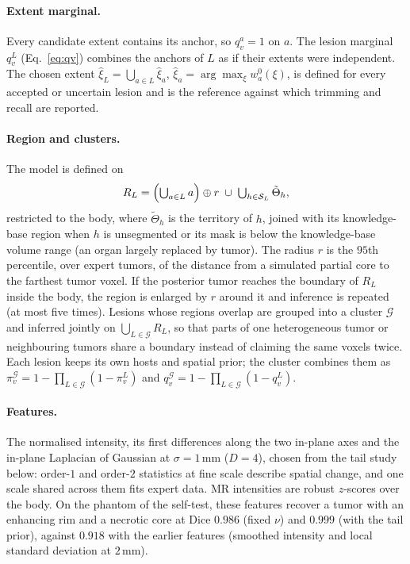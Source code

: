 \documentclass[fleqn,10pt]{olplainarticle}
\begin{document}
\paragraph{Extent marginal.} Every candidate extent contains its anchor, so $q^a_v=1$ on $a$. The lesion marginal $q^L_v$
(Eq.~\eqref{eq:qv}) combines the anchors of $L$ as if their extents were independent. The chosen extent
$\hat\xi_L=\bigcup_{a\in L}\hat\xi_a$, $\hat\xi_a=\arg\max_\xi w^0_a(\xi)$, is defined for every accepted or uncertain
lesion and is the reference against which trimming and recall are reported.

\paragraph{Region and clusters.} The model is defined on
\begin{equation}
\label{eq:roi}
R_L=\Bigl(\textstyle\bigcup_{a\in L}a\Bigr)\oplus r\;\cup\;\bigcup_{h\in\mathcal{S}_L}\tilde\Theta_h ,
\end{equation}
restricted to the body, where $\tilde\Theta_h$ is the territory of $h$, joined with its knowledge-base region when $h$ is
unsegmented or its mask is below the knowledge-base volume range (an organ largely replaced by tumor). The radius $r$ is the
$95$th percentile, over expert tumors, of the distance from a simulated partial core to the farthest tumor voxel. If the
posterior tumor reaches the boundary of $R_L$ inside the body, the region is enlarged by $r$ around it and inference is
repeated (at most five times). Lesions whose regions overlap are grouped into a cluster $\mathcal{G}$ and inferred jointly on
$\bigcup_{L\in\mathcal{G}}R_L$, so that parts of one heterogeneous tumor or neighbouring tumors share a boundary instead of
claiming the same voxels twice. Each lesion keeps its own hosts and spatial prior; the cluster combines them as
$\pi^{\mathcal{G}}_v=1-\prod_{L\in\mathcal{G}}(1-\pi^L_v)$ and $q^{\mathcal{G}}_v=1-\prod_{L\in\mathcal{G}}(1-q^L_v)$.

\paragraph{Features.} The normalised intensity, its first differences along the two in-plane axes and the in-plane
Laplacian of Gaussian at $\sigma=1$\,mm ($D=4$), chosen from the tail study below: order-$1$ and order-$2$ statistics at fine
scale describe spatial change, and one scale shared across them fits expert data. MR intensities are robust $z$-scores over
the body. On the phantom of the self-test, these features recover a tumor with an enhancing rim and a necrotic core at Dice
$0.986$ (fixed $\nu$) and $0.999$ (with the tail prior), against $0.918$ with the earlier features (smoothed intensity and local
standard deviation at $2$\,mm).
\end{document}
